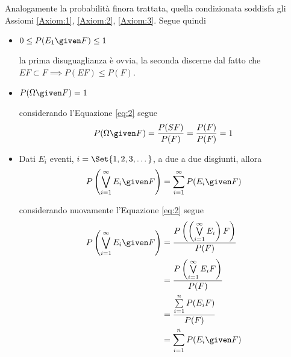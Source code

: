 \documentclass{subfiles}
\begin{document}
Analogamente la probabilità finora trattata, quella condizionata soddisfa gli Assiomi \eqref{Axiom:1}, \eqref{Axiom:2}, \eqref{Axiom:3}. Segue quindi
\begin{itemize}
    \item \(0 \le P(E_{1} \given F) \le 1\)
          \begin{Proof*}
              la prima disuguaglianza è ovvia, la seconda discerne dal fatto che \(EF \subset F \implies P(EF) \le P(F)\).
          \end{Proof*}

    \item \(P(\Omega\given F) = 1\)
          \begin{Proof*}
              considerando l'Equazione \eqref{eq:2} segue
              \[
                  P(\Omega \given F) = \frac{P(SF)}{P(F)} = \frac{P(F)}{P(F)} = 1
              \]
          \end{Proof*}

    \item Dati \(E_{i}\) eventi, \(i = \Set{1, 2, 3, \dots}\), a due a due disgiunti, allora
          \[
              P \left( \bigvee\limits_{i = 1}^{\infty}{E_{i} \given F} \right) = \sum\limits_{i = 1}^{\infty}{P(E_{i} \given F)}
          \]
          \begin{Proof*}
              considerando nuovamente  l'Equazione \eqref{eq:2} segue
              \[\begin{aligned}
                      P \left( \bigvee\limits_{i = 1}^{\infty}{E_{i} \given F} \right) & = \frac{P \left(\left(\bigvee\limits_{i = 1}^{\infty}{E_{i}} \right) F \right)}{P(F)} \\
                                                                                       & = \frac{P \left(\bigvee\limits_{i = 1}^{\infty}{E_{i}F} \right)}{P(F)}                \\
                                                                                       & = \frac{\sum\limits_{i = 1}^{n}{P(E_{i}F)}}{P(F)}                                     \\
                                                                                       & = \sum\limits_{i = 1}^{n}{P(E_{i} \given F)}
                  \end{aligned}\]
          \end{Proof*}
\end{itemize}
\end{document}
